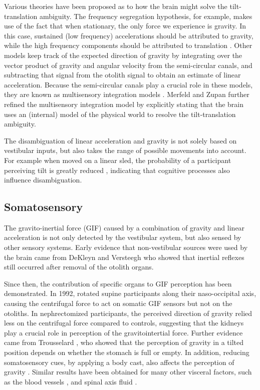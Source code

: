 Various theories have been proposed as to how the brain might solve the tilt-translation ambiguity. The frequency segregation hypothesis, for example, makes use of the fact that when stationary, the only force we experience is gravity. In this case, sustained (low frequency) accelerations should be  attributed to gravity, while the high frequency components should be attributed to translation \cite{paige1991, telford1997}. Other models keep track of the expected direction of gravity by integrating over the vector product of gravity and angular velocity from the semi-circular canals, and subtracting that signal from the otolith signal to obtain an estimate of linear acceleration. Because the semi-circular canals play a  crucial role in these models, they are known as multisensory integration models \cite{mayne1974,ormsby1977}. Merfeld and Zupan \citeyear{merfeld1995,merfeld2002} further refined the multisensory integration model by explicitly stating that the brain uses an (internal) model of the physical world to resolve the tilt-translation ambiguity.

The disambiguation of linear acceleration and gravity is not solely based on vestibular inputs, but also takes the  range of  possible movements into account. For example when moved on a linear sled, the probability of a participant perceiving tilt is greatly reduced \cite{wertheim2001}, indicating that cognitive processes also influence disambiguation.


\subsection{Somatosensory}
The gravito-inertial force (GIF) caused by a combination of gravity and linear acceleration is not only detected by the vestibular system, but also sensed by other sensory systems. Early evidence that non-vestibular sources were used by the brain came from DeKleyn and Versteegh \citeyear{dekleyn1933} who showed that inertial reflexes still occurred after removal of the otolith organs.

Since then, the contribution of specific organs to GIF perception has been demonstrated. In 1992, \citeauthor{mittelstaedt1992} rotated supine participants along  their naso-occipital axis,  causing  the centrifugal force to act on somatic GIF sensors  but not on the otoliths. In nephrectomized participants, the perceived direction of gravity relied less on the centrifugal force compared to controls, suggesting that the kidneys play a crucial role in perception of the gravitointertial force. Further evidence came from Trousselard \citeyear{trousselard2004}, who showed that the perception of gravity in a tilted position depends on whether the stomach is full or empty. In addition, reducing somatosensory cues, by applying a body cast, also affects the perception of gravity \cite{trousselard2004}.  Similar results have been obtained for many other visceral factors, such as the blood vessels \cite{vaitl2002}, and spinal axis fluid \cite{vaitl1997}.


